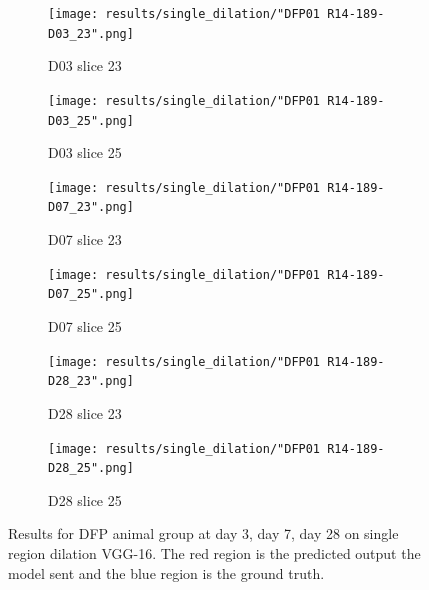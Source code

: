 \begin{figure}[!htb]  
    \centering %
\begin{subfigure}{0.35\textwidth}
  \texttt{[image: results/single\_dilation/"DFP01 R14-189-D03\_23".png]}
  \caption{D03 slice 23}
\end{subfigure}\hfil %
\begin{subfigure}{0.35\textwidth}
  \texttt{[image: results/single\_dilation/"DFP01 R14-189-D03\_25".png]}
  \caption{D03 slice 25}
\end{subfigure}

\medskip
\begin{subfigure}{0.35\textwidth}
  \texttt{[image: results/single\_dilation/"DFP01 R14-189-D07\_23".png]}
  \caption{D07 slice 23}
\end{subfigure}\hfil %
\begin{subfigure}{0.35\textwidth}
  \texttt{[image: results/single\_dilation/"DFP01 R14-189-D07\_25".png]}
  \caption{D07 slice 25}
\end{subfigure}

\medskip
\begin{subfigure}{0.35\textwidth}
  \texttt{[image: results/single\_dilation/"DFP01 R14-189-D28\_23".png]}
  \caption{D28 slice 23}
\end{subfigure}\hfil %
\begin{subfigure}{0.35\textwidth}
  \texttt{[image: results/single\_dilation/"DFP01 R14-189-D28\_25".png]}
  \caption{D28 slice 25}
\end{subfigure}
  
  \caption{Results for DFP animal group at day 3, day 7, day 28 on single region dilation VGG-16. The red region is the predicted output the model sent and the blue region is the ground truth.}
  \label{fig:results_single_dilation_DFP}
\end{figure}


